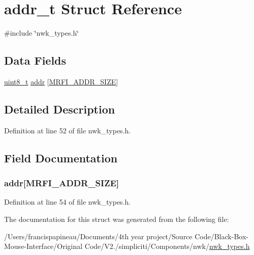 \hypertarget{structaddr__t}{\section{addr\-\_\-t \-Struct \-Reference}
\label{structaddr__t}
}


{\ttfamily \#include \char`\"{}nwk\-\_\-types.\-h\char`\"{}}

\subsection*{\-Data \-Fields}
\begin{DoxyCompactItemize}
\item 
\hyperlink{bsp__msp430__defs_8h_aba7bc1797add20fe3efdf37ced1182c5}{uint8\-\_\-t} \hyperlink{structaddr__t_a774858e8a0bebe3dc06db9e8e64b2051}{addr} \mbox{[}\hyperlink{mrfi_8h_a5491e55db4c46a461c9e86faa9e0a9b1}{\-M\-R\-F\-I\-\_\-\-A\-D\-D\-R\-\_\-\-S\-I\-Z\-E}\mbox{]}
\end{DoxyCompactItemize}


\subsection{\-Detailed \-Description}


\-Definition at line 52 of file nwk\-\_\-types.\-h.



\subsection{\-Field \-Documentation}
\hypertarget{structaddr__t_a774858e8a0bebe3dc06db9e8e64b2051}{
\subsubsection[{addr}]{ {\bf addr}\mbox{[}{\bf \-M\-R\-F\-I\-\_\-\-A\-D\-D\-R\-\_\-\-S\-I\-Z\-E}\mbox{]}}}\label{structaddr__t_a774858e8a0bebe3dc06db9e8e64b2051}


\-Definition at line 54 of file nwk\-\_\-types.\-h.



\-The documentation for this struct was generated from the following file\-:\begin{DoxyCompactItemize}
\item 
/\-Users/francispapineau/\-Documents/4th year project/\-Source Code/\-Black-\/\-Box-\/\-Mouse-\/\-Interface/\-Original Code/\-V2./simpliciti/\-Components/nwk/\hyperlink{nwk__types_8h}{nwk\-\_\-types.\-h}\end{DoxyCompactItemize}
